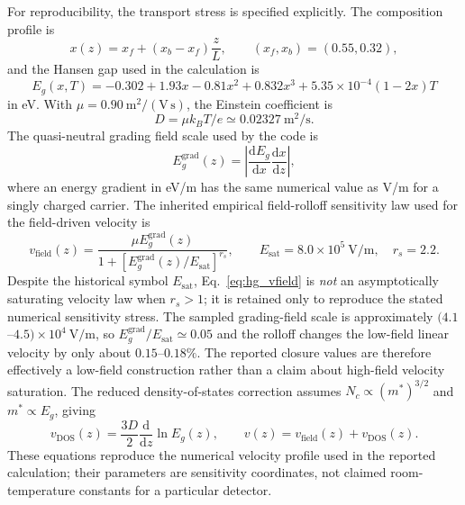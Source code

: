\documentclass[11pt]{article}
\newcommand{\dd}{\mathrm{d}}
\begin{document}
For reproducibility, the transport stress is specified explicitly. The composition profile is
\begin{equation}
x(z)=x_f+(x_b-x_f)\frac{z}{L},\qquad (x_f,x_b)=(0.55,0.32),
\end{equation}
and the Hansen gap used in the calculation is
\begin{equation}
\boxed{E_g(x,T)=-0.302+1.93x-0.81x^2+0.832x^3+5.35\times10^{-4}(1-2x)T}
\label{eq:hansen_explicit}
\end{equation}
in eV. With $\mu=0.90~\mathrm{m^2/(V\,s)}$, the Einstein coefficient is
\begin{equation}
D=\mu k_BT/e\simeq0.02327~\mathrm{m^2/s}.
\end{equation}
The quasi-neutral grading field scale used by the code is
\begin{equation}
E_g^{\mathrm{grad}}(z)=\left|\frac{\dd E_g}{\dd x}\frac{\dd x}{\dd z}\right|,
\end{equation}
where an energy gradient in eV/m has the same numerical value as V/m for a singly charged carrier. The inherited empirical field-rolloff sensitivity law used for the field-driven velocity is
\begin{equation}
v_{\mathrm{field}}(z)=\frac{\mu E_g^{\mathrm{grad}}(z)}{1+[E_g^{\mathrm{grad}}(z)/E_{\mathrm{sat}}]^{r_s}},
\qquad E_{\mathrm{sat}}=8.0\times10^5~\mathrm{V/m},\quad r_s=2.2.
\label{eq:hg_vfield}
\end{equation}
Despite the historical symbol $E_{\mathrm{sat}}$, Eq.~\eqref{eq:hg_vfield} is \emph{not} an asymptotically saturating velocity law when $r_s>1$; it is retained only to reproduce the stated numerical sensitivity stress. The sampled grading-field scale is approximately $(4.1$--$4.5)\times10^4~\mathrm{V/m}$, so $E_g^{\mathrm{grad}}/E_{\mathrm{sat}}\simeq0.05$ and the rolloff changes the low-field linear velocity by only about $0.15$--$0.18\%$. The reported closure values are therefore effectively a low-field construction rather than a claim about high-field velocity saturation. The reduced density-of-states correction assumes $N_c\propto(m^*)^{3/2}$ and $m^*\propto E_g$, giving
\begin{equation}
\boxed{v_{\mathrm{DOS}}(z)=\frac{3D}{2}\frac{\dd}{\dd z}\ln E_g(z),\qquad v(z)=v_{\mathrm{field}}(z)+v_{\mathrm{DOS}}(z).}
\label{eq:hg_velocity}
\end{equation}
These equations reproduce the numerical velocity profile used in the reported calculation; their parameters are sensitivity coordinates, not claimed room-temperature constants for a particular detector.
\end{document}
